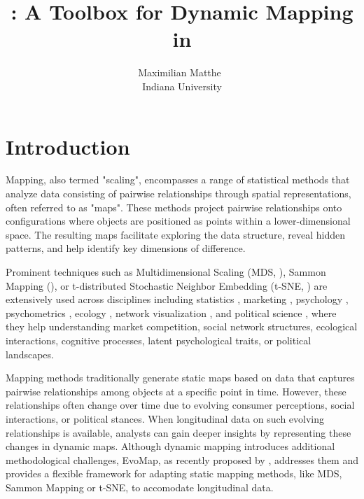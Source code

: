 \documentclass[article]{jss}
\author{Maximilian Matthe~\orcidlink{0000-0002-5059-4789}\\Indiana University}
\title{\proglang{evomap}: A Toolbox for Dynamic Mapping in \proglang{Python}}
\begin{document}


\section[Introduction]{Introduction} \label{sec:intro}

Mapping, also termed "scaling", encompasses a range of statistical methods that analyze data 
consisting of pairwise relationships through spatial representations, often referred to as "maps". 
These methods project pairwise relationships onto configurations where objects are positioned 
as points within a lower-dimensional space. The resulting maps facilitate exploring the data structure, reveal hidden patterns, 
and help identify key dimensions of difference.

Prominent techniques such as Multidimensional Scaling (MDS, \cite{Carroll+Arabie:1998}), 
Sammon Mapping (\cite{Sammon:1969}), or t-distributed Stochastic Neighbor Embedding 
(t-SNE, \cite{van-der-Maaten+Hinton:2008}) are extensively used across disciplines including 
statistics \citep{Saeed+etal:2019}, marketing \citep{DeSarbo+Manrai+Manrai:1994}, 
psychology \citep{Goodwill+Alasdair+Meloy:2019}, 
psychometrics \citep{Hebart+Zheng+Pereira+Baker:2020}, 
ecology \citep{Kenkel+Orloci:1986}, 
network visualization \citep{Mane+Boerner:2004}, 
and political science \citep{Jacoby+Armstrong:2014}, where they help understanding 
market competition, social network structures, ecological interactions, cognitive processes, 
latent psychological traits, or political landscapes. 

Mapping methods traditionally generate static maps based on data that captures pairwise relationships among objects 
at a specific point in time. However, these relationships often change over time due to evolving consumer perceptions, 
social interactions, or political stances. When longitudinal data on such evolving relationships is available, 
analysts can gain deeper insights by representing these changes in dynamic maps. Although dynamic mapping introduces
additional methodological challenges, EvoMap, as recently proposed by \citep{Matthe+Ringel+Skiera:2023}, addresses them
and provides a flexible framework for adapting static mapping methods, like MDS, Sammon Mapping or t-SNE, to accomodate longitudinal data.
\end{document}

